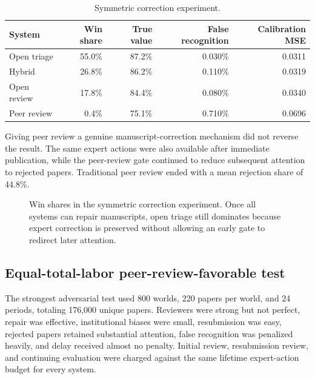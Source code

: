 \documentclass[11pt]{article}
\begin{document}
\begin{table}[ht]
\centering
\caption{Symmetric correction experiment.}
\label{tab:symmetric}
\small
\begin{tabular}{lrrrr}
\toprule
System & Win share & True value & False recognition & Calibration MSE\\
\midrule
Open triage & 55.0\% & 87.2\% & 0.030\% & 0.0311\\
Hybrid & 26.8\% & 86.2\% & 0.110\% & 0.0319\\
Open review & 17.8\% & 84.4\% & 0.080\% & 0.0340\\
Peer review & 0.4\% & 75.1\% & 0.710\% & 0.0696\\
\bottomrule
\end{tabular}
\end{table}

Giving peer review a genuine manuscript-correction mechanism did not reverse the result. The same expert actions were also available after immediate publication, while the peer-review gate continued to reduce subsequent attention to rejected papers. Traditional peer review ended with a mean rejection share of 44.8\%.


\begin{figure}[ht]
\centering
{}
\caption{Win shares in the symmetric correction experiment. Once all systems can repair manuscripts, open triage still dominates because expert correction is preserved without allowing an early gate to redirect later attention.}
\label{fig:symmetric_wins}
\end{figure}

\subsection{Equal-total-labor peer-review-favorable test}

The strongest adversarial test used 800 worlds, 220 papers per world, and 24 periods, totaling 176,000 unique papers. Reviewers were strong but not perfect, repair was effective, institutional biases were small, resubmission was easy, rejected papers retained substantial attention, false recognition was penalized heavily, and delay received almost no penalty. Initial review, resubmission review, and continuing evaluation were charged against the same lifetime expert-action budget for every system.
\end{document}
